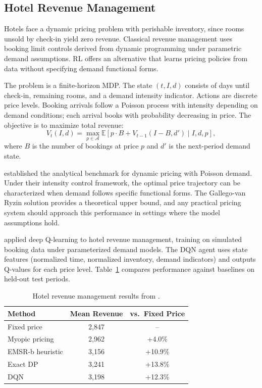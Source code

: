 \subsection{Hotel Revenue Management}
\label{sec:hotel}

Hotels face a dynamic pricing problem with perishable inventory, since rooms unsold by check-in yield zero revenue. Classical revenue management uses booking limit controls derived from dynamic programming under parametric demand assumptions. RL offers an alternative that learns pricing policies from data without specifying demand functional forms.

The problem is a finite-horizon MDP. The state $(t, I, d)$ consists of days until check-in, remaining rooms, and a demand intensity indicator. Actions are discrete price levels. Booking arrivals follow a Poisson process with intensity depending on demand conditions; each arrival books with probability decreasing in price. The objective is to maximize total revenue:
\begin{equation}
V_t(I, d) = \max_{p \in \mathcal{A}} \mathbb{E}\left[ p \cdot B + V_{t-1}(I - B, d') \mid I, d, p \right],
\end{equation}
where $B$ is the number of bookings at price $p$ and $d'$ is the next-period demand state.

\citet{Gallego1994pricing} established the analytical benchmark for dynamic pricing with Poisson demand. Under their intensity control framework, the optimal price trajectory can be characterized when demand follows specific functional forms. The Gallego-van Ryzin solution provides a theoretical upper bound, and any practical pricing system should approach this performance in settings where the model assumptions hold.

\citet{Chen2023hotelrl} applied deep Q-learning to hotel revenue management, training on simulated booking data under parameterized demand models. The DQN agent uses state features (normalized time, normalized inventory, demand indicators) and outputs Q-values for each price level. Table~\ref{tab:hotel_results} compares performance against baselines on held-out test periods.

\begin{table}[htbp]
\centering
\caption{Hotel revenue management results from \citet{Chen2023hotelrl}.}
\label{tab:hotel_results}
\begin{tabular}{lcc}
\toprule
Method & Mean Revenue & vs.\ Fixed Price \\
\midrule
Fixed price & 2,847 & -- \\
Myopic pricing & 2,962 & +4.0\% \\
EMSR-b heuristic & 3,156 & +10.9\% \\
Exact DP & 3,241 & +13.8\% \\
DQN & 3,198 & +12.3\% \\
\bottomrule
\end{tabular}
\end{table}

